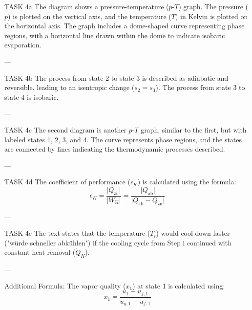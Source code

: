 TASK 4a  
The diagram shows a pressure-temperature (\(p\)-\(T\)) graph. The pressure (\(p\)) is plotted on the vertical axis, and the temperature (\(T\)) in Kelvin is plotted on the horizontal axis. The graph includes a dome-shaped curve representing phase regions, with a horizontal line drawn within the dome to indicate isobaric evaporation.

---

TASK 4b  
The process from state 2 to state 3 is described as adiabatic and reversible, leading to an isentropic change (\(s_2 = s_3\)). The process from state 3 to state 4 is isobaric.

---

TASK 4c  
The second diagram is another \(p\)-\(T\) graph, similar to the first, but with labeled states 1, 2, 3, and 4. The curve represents phase regions, and the states are connected by lines indicating the thermodynamic processes described.

---

TASK 4d  
The coefficient of performance (\(\epsilon_K\)) is calculated using the formula:  
\[
\epsilon_K = \frac{\lvert Q_{\text{zu}} \rvert}{\lvert W_{\text{K}} \rvert} = \frac{\lvert Q_{\text{ab}} \rvert}{\lvert Q_{\text{ab}} - Q_{\text{zu}} \rvert}
\]

---

TASK 4e  
The text states that the temperature (\(T_i\)) would cool down faster ("würde schneller abkühlen") if the cooling cycle from Step i continued with constant heat removal (\(\dot{Q}_K\)).

---

Additional Formula:  
The vapor quality (\(x_1\)) at state 1 is calculated using:  
\[
x_1 = \frac{u_1 - u_{f,1}}{u_{g,1} - u_{f,1}}
\]